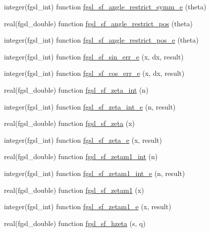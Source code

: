 \begin{DoxyCompactItemize}
integer(fgsl\+\_\+int) function \hyperlink{specfunc_8finc_a8d0429655dd67743a735e27d1f8ad077}{fgsl\+\_\+sf\+\_\+angle\+\_\+restrict\+\_\+symm\+\_\+e} (theta)
\item 
real(fgsl\+\_\+double) function \hyperlink{specfunc_8finc_a83fc3ecbb2016e0bfb9ffbef3458f793}{fgsl\+\_\+sf\+\_\+angle\+\_\+restrict\+\_\+pos} (theta)
\item 
integer(fgsl\+\_\+int) function \hyperlink{specfunc_8finc_a79e9eb81ed49440d7af94e13bbb97253}{fgsl\+\_\+sf\+\_\+angle\+\_\+restrict\+\_\+pos\+\_\+e} (theta)
\item 
integer(fgsl\+\_\+int) function \hyperlink{specfunc_8finc_ac9c94e408974c1a29afbdeba275e206e}{fgsl\+\_\+sf\+\_\+sin\+\_\+err\+\_\+e} (x, dx, result)
\item 
integer(fgsl\+\_\+int) function \hyperlink{specfunc_8finc_a3692646ebbef1e7eb581ec851029d615}{fgsl\+\_\+sf\+\_\+cos\+\_\+err\+\_\+e} (x, dx, result)
\item 
real(fgsl\+\_\+double) function \hyperlink{specfunc_8finc_af9c46c23455b430937b3d21e3e8c5678}{fgsl\+\_\+sf\+\_\+zeta\+\_\+int} (n)
\item 
integer(fgsl\+\_\+int) function \hyperlink{specfunc_8finc_a922363ceb589f2ed5186461873b8f63c}{fgsl\+\_\+sf\+\_\+zeta\+\_\+int\+\_\+e} (n, result)
\item 
real(fgsl\+\_\+double) function \hyperlink{specfunc_8finc_a75dbcf8f19fa5845ba4a0c15fd6bff2c}{fgsl\+\_\+sf\+\_\+zeta} (x)
\item 
integer(fgsl\+\_\+int) function \hyperlink{specfunc_8finc_a4d4cd10f3d4bdefaf60496978adb455e}{fgsl\+\_\+sf\+\_\+zeta\+\_\+e} (x, result)
\item 
real(fgsl\+\_\+double) function \hyperlink{specfunc_8finc_abb2fd0500d52ae949df6f8a21eca3499}{fgsl\+\_\+sf\+\_\+zetam1\+\_\+int} (n)
\item 
integer(fgsl\+\_\+int) function \hyperlink{specfunc_8finc_a70a3f78f3169bba6f910a9469ee62102}{fgsl\+\_\+sf\+\_\+zetam1\+\_\+int\+\_\+e} (n, result)
\item 
real(fgsl\+\_\+double) function \hyperlink{specfunc_8finc_a9401283d3378c5dd26d0f228441c104f}{fgsl\+\_\+sf\+\_\+zetam1} (x)
\item 
integer(fgsl\+\_\+int) function \hyperlink{specfunc_8finc_af728059dee8d3b74441fc8b39fe80bf9}{fgsl\+\_\+sf\+\_\+zetam1\+\_\+e} (x, result)
\item 
real(fgsl\+\_\+double) function \hyperlink{specfunc_8finc_a06def0fd7fc6ef5a113c86345ccac664}{fgsl\+\_\+sf\+\_\+hzeta} (s, q)
\item 

\end{DoxyCompactItemize}
